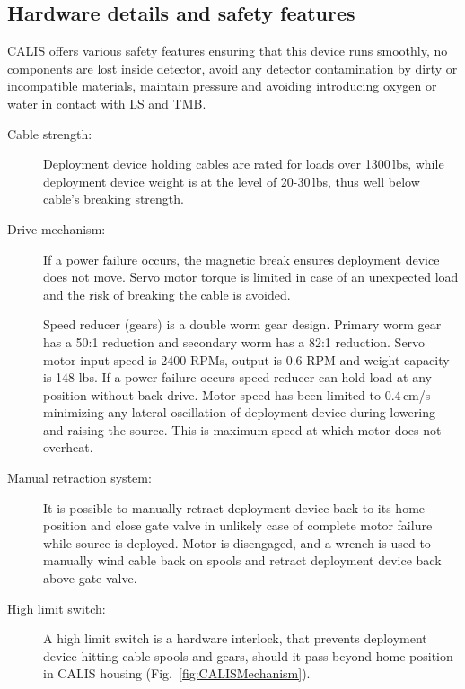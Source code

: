 \subsection{Hardware details and safety features}\label{sec:HardwareDetails}\label{sec:SafetyFeatures}
CALIS offers various safety features ensuring that this device runs smoothly, no components are lost inside detector, avoid any detector contamination by dirty or incompatible materials, maintain pressure and avoiding introducing oxygen or water in contact with LS and TMB. %

\begin{description}

\item[Cable strength:]
Deployment device holding cables are rated for loads over 1300\,lbs, while deployment device weight is at the level of 20-30\,lbs, thus well below cable's breaking strength. 

\item[Drive mechanism:]
If a power failure occurs, the magnetic break ensures deployment device does not move. Servo motor torque is limited in case of an unexpected load and the risk of breaking the cable is avoided.

Speed reducer (gears) is a double worm gear design. Primary worm gear has a 50:1 reduction and secondary worm has a 82:1 reduction. Servo motor input speed is 2400 RPMs, output is 0.6 RPM and weight capacity is 148 lbs. If a power failure occurs speed reducer can hold load at any position without back drive. Motor speed has been limited to 0.4\,cm/s minimizing any lateral oscillation of deployment device during lowering and raising the source. This is maximum speed at which motor does not overheat.

\item[Manual retraction system:]
It is possible to manually retract deployment device back to its home position and close gate valve in unlikely case of complete motor failure while source is deployed. Motor is disengaged, and a wrench is used to manually wind cable back on spools and retract deployment device back above gate valve. 
   
\item[High limit switch:]
A high limit switch is a hardware interlock, that prevents deployment device hitting cable spools and gears, should it pass beyond home position in CALIS housing (Fig.~\ref{fig:CALISMechanism}). 


\end{description}

